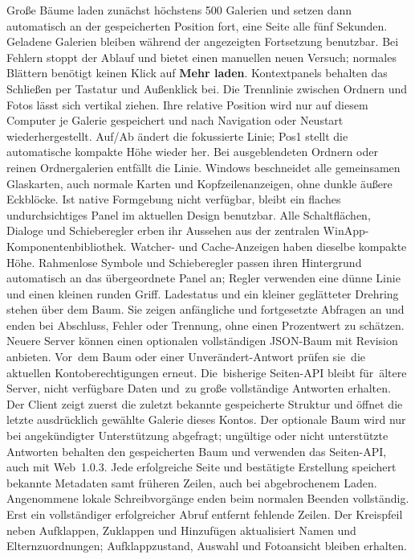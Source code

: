 \documentclass[11pt,a4paper]{article}
\newcommand{\ui}[1]{\textbf{#1}}
\begin{document}
Große Bäume laden zunächst höchstens 500 Galerien und setzen dann automatisch
an der gespeicherten Position fort, eine Seite alle fünf Sekunden. Geladene
Galerien bleiben während der angezeigten Fortsetzung benutzbar. Bei Fehlern
stoppt der Ablauf und bietet einen manuellen neuen Versuch; normales Blättern
benötigt keinen Klick auf \ui{Mehr laden}. Kontextpanels behalten das Schließen
per Tastatur und Außenklick bei.
Die Trennlinie zwischen Ordnern und Fotos lässt sich vertikal ziehen. Ihre
relative Position wird nur auf diesem Computer je Galerie gespeichert und nach
Navigation oder Neustart wiederhergestellt. Auf/Ab ändert die fokussierte Linie;
Pos1 stellt die automatische kompakte Höhe wieder her. Bei ausgeblendeten
Ordnern oder reinen Ordnergalerien entfällt die Linie.
Windows beschneidet alle gemeinsamen Glaskarten, auch normale Karten und
Kopfzeilenanzeigen, ohne dunkle äußere Eckblöcke.
Ist native Formgebung nicht verfügbar, bleibt ein flaches undurchsichtiges
Panel im aktuellen Design benutzbar. Alle Schaltflächen, Dialoge und Schieberegler
erben ihr Aussehen aus der zentralen WinApp-Komponentenbibliothek.
Watcher- und Cache-Anzeigen haben dieselbe kompakte Höhe. Rahmenlose Symbole
und Schieberegler passen ihren Hintergrund automatisch an das übergeordnete
Panel an; Regler verwenden eine dünne Linie und einen kleinen runden Griff.
Ladestatus und ein kleiner geglätteter Drehring stehen über dem Baum. Sie zeigen
anfängliche und fortgesetzte Abfragen an und enden bei Abschluss, Fehler oder
Trennung, ohne einen Prozentwert zu schätzen.
Neuere Server können einen optionalen vollständigen JSON-Baum mit Revision
anbieten. Vor~dem Baum oder einer Unverändert-Antwort prüfen sie~die aktuellen
Kontoberechtigungen erneut. Die~bisherige Seiten-API bleibt für~ältere Server,
nicht verfügbare Daten und~zu große vollständige Antworten erhalten.
Der Client zeigt zuerst die zuletzt bekannte gespeicherte Struktur und
öffnet die letzte ausdrücklich gewählte Galerie dieses Kontos. Der optionale
Baum wird nur bei angekündigter Unterstützung abgefragt; ungültige oder nicht
unterstützte Antworten behalten den gespeicherten Baum und verwenden das
Seiten-API, auch mit Web~1.0.3. Jede erfolgreiche Seite und bestätigte Erstellung
speichert bekannte Metadaten samt früheren Zeilen, auch bei abgebrochenem Laden.
Angenommene lokale Schreibvorgänge enden beim normalen Beenden vollständig.
Erst ein vollständiger erfolgreicher Abruf entfernt fehlende Zeilen. Der
Kreispfeil neben Aufklappen, Zuklappen und Hinzufügen aktualisiert Namen und
Elternzuordnungen; Aufklappzustand, Auswahl und Fotoansicht bleiben erhalten.
\end{document}
